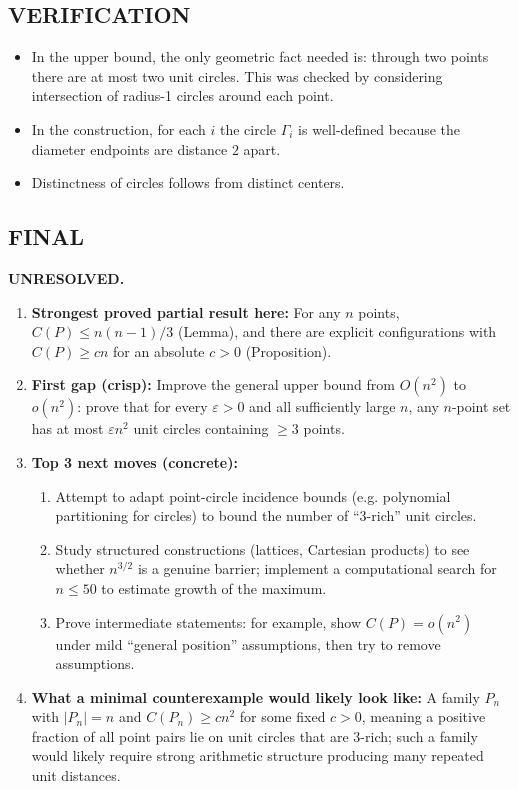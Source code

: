 \subsection*{VERIFICATION}
\begin{itemize}[leftmargin=2em]
\item In the upper bound, the only geometric fact needed is: through two points there are at most two unit circles. This was checked by considering intersection of radius-1 circles around each point.
\item In the construction, for each $i$ the circle $\Gamma_i$ is well-defined because the diameter endpoints are distance $2$ apart.
\item Distinctness of circles follows from distinct centers.
\end{itemize}

\subsection*{FINAL}
\textbf{UNRESOLVED.}
\begin{enumerate}[label=(\roman*),leftmargin=2.5em]
\item \textbf{Strongest proved partial result here:}
For any $n$ points, $C(P)\le n(n-1)/3$ (Lemma), and there are explicit configurations with $C(P)\ge c n$ for an absolute $c>0$ (Proposition).
\item \textbf{First gap (crisp):}
Improve the general upper bound from $O(n^2)$ to $o(n^2)$: prove that for every $\varepsilon>0$ and all sufficiently large $n$, any $n$-point set has at most $\varepsilon n^2$ unit circles containing $\ge 3$ points.
\item \textbf{Top 3 next moves (concrete):}
\begin{enumerate}[label=(\alph*),leftmargin=2.5em]
\item Attempt to adapt point-circle incidence bounds (e.g. polynomial partitioning for circles) to bound the number of ``3-rich'' unit circles.
\item Study structured constructions (lattices, Cartesian products) to see whether $n^{3/2}$ is a genuine barrier; implement a computational search for $n\le 50$ to estimate growth of the maximum.
\item Prove intermediate statements: for example, show $C(P)=o(n^2)$ under mild ``general position'' assumptions, then try to remove assumptions.
\end{enumerate}
\item \textbf{What a minimal counterexample would likely look like:}
A family $P_n$ with $|P_n|=n$ and $C(P_n)\ge c n^2$ for some fixed $c>0$, meaning a positive fraction of all point pairs lie on unit circles that are 3-rich; such a family would likely require strong arithmetic structure producing many repeated unit distances.
\end{enumerate}



